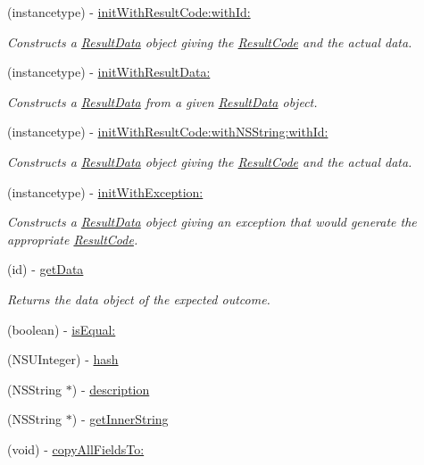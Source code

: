 \begin{DoxyCompactItemize}
\item 
(instancetype) -\/ \hyperlink{interface_result_data_abf2932258ef43754629de7e54722781d}{init\+With\+Result\+Code\+:with\+Id\+:}
\begin{DoxyCompactList}\small\item\em Constructs a \hyperlink{interface_result_data}{Result\+Data} object giving the \hyperlink{interface_result_code}{Result\+Code} and the actual data. \end{DoxyCompactList}\item 
(instancetype) -\/ \hyperlink{interface_result_data_ae193e41dbfa867a0270a64f56de0a996}{init\+With\+Result\+Data\+:}
\begin{DoxyCompactList}\small\item\em Constructs a \hyperlink{interface_result_data}{Result\+Data} from a given \hyperlink{interface_result_data}{Result\+Data} object. \end{DoxyCompactList}\item 
(instancetype) -\/ \hyperlink{interface_result_data_a25e4645bd0d1dcd559963e64b71432c6}{init\+With\+Result\+Code\+:with\+N\+S\+String\+:with\+Id\+:}
\begin{DoxyCompactList}\small\item\em Constructs a \hyperlink{interface_result_data}{Result\+Data} object giving the \hyperlink{interface_result_code}{Result\+Code} and the actual data. \end{DoxyCompactList}\item 
(instancetype) -\/ \hyperlink{interface_result_data_aeb1da32c7bc8a16fe14716807d1fe298}{init\+With\+Exception\+:}
\begin{DoxyCompactList}\small\item\em Constructs a \hyperlink{interface_result_data}{Result\+Data} object giving an exception that would generate the appropriate \hyperlink{interface_result_code}{Result\+Code}. \end{DoxyCompactList}\item 
(id) -\/ \hyperlink{interface_result_data_af9d8496e5abb6a22f8bf6cd67f2b4c6a}{get\+Data}
\begin{DoxyCompactList}\small\item\em Returns the data object of the expected outcome. \end{DoxyCompactList}\item 
(boolean) -\/ \hyperlink{interface_result_data_a4f47df827f169dee73e7a0a382f2ab7e}{is\+Equal\+:}
\item 
(N\+S\+U\+Integer) -\/ \hyperlink{interface_result_data_a1da5e0fe60288310fb42716961643a65}{hash}
\item 
(N\+S\+String $\ast$) -\/ \hyperlink{interface_result_data_a03704ce86cecbc79b4ca31b534f149ad}{description}
\item 
(N\+S\+String $\ast$) -\/ \hyperlink{interface_result_data_af72eca602dd71025995f1b58f30db711}{get\+Inner\+String}
\item 
(void) -\/ \hyperlink{interface_result_data_a1cc5289080156eaef351bc4d9d18fb84}{copy\+All\+Fields\+To\+:}
\end{DoxyCompactItemize}
